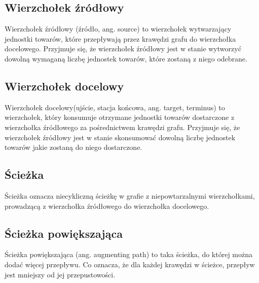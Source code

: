 \documentclass[10pt]{minutes}
\begin{document}
\subsection{Wierzchołek źródłowy}
Wierzchołek źródłowy (źródło, ang. source) to wierzchołek wytwarzający jednostki towarów, które przepływają przez krawędzi grafu do wierzchołka docelowego. Przyjmuje się, że wierzchołek źródłowy jest w stanie wytworzyć dowolną wymaganą liczbę jednostek towarów, które zostaną z niego odebrane.
\subsection{Wierzchołek docelowy}
Wierzchołek docelowy(ujście, stacja końcowa, ang. target, terminus) to wierzchołek, który konsumuje otrzymane jednostki towarów dostarczone z wierzchołka źródłowego za pośrednictwem krawędzi grafu. Przyjmuje się, że wierzchołek źródłowy jest w stanie skonsumować dowolną liczbę jednostek towarów jakie zostaną do niego dostarczone.
\subsection{Ścieżka}
Ścieżka oznacza niecykliczną ścieżkę w grafie z niepowtarzalnymi wierzchołkami, prowadzącą z wierzchołka źródłowego do wierzchołka docelowego.
\subsection{Ścieżka powiększająca}
Ścieżka powiększająca (ang. augmenting path) to taka ścieżka, do której można dodać więcej przepływu. Co oznacza, że dla każdej krawędzi w ścieżce, przepływ jest mniejszy od jej przepustowości.
\end{document}
